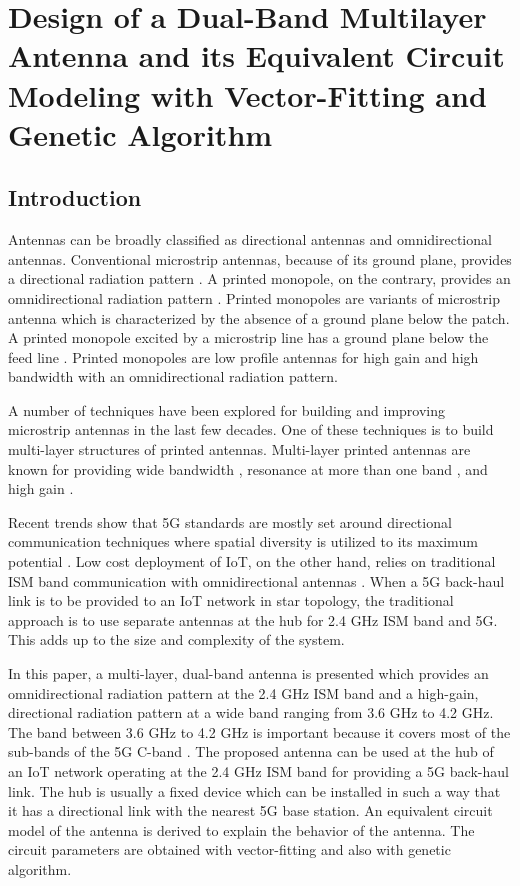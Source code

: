 \chapter{Design of a Dual-Band Multilayer Antenna and its Equivalent Circuit Modeling with Vector-Fitting and Genetic Algorithm}
\label{chap:chap4}
\section{Introduction}\label{c4sec:intro}
Antennas can be broadly classified as directional antennas and omnidirectional antennas. Conventional microstrip antennas, because of its ground plane, provides a directional radiation pattern \cite{handbook}. A printed monopole, on the contrary, provides an omnidirectional radiation pattern \cite{pma_stripline, pma_dualband}. Printed monopoles are variants of microstrip antenna which is characterized by the absence of a ground plane below the patch. A printed monopole excited by a microstrip line has a ground plane below the feed line \cite{pma_stripline}. Printed monopoles are low profile antennas for high gain and high bandwidth with an omnidirectional radiation pattern\cite{PMA01}.

A number of techniques have been explored for building and improving microstrip antennas in the last few decades. One of these techniques is to build multi-layer structures of printed antennas. Multi-layer printed antennas are known for providing wide bandwidth \cite{ML_WideBand01}, resonance at more than one band \cite{ML_DualBand01, ML_DualBand02}, and high gain \cite{ML_high_gain_parasitic_slot}.

Recent trends show that 5G standards are mostly set around directional communication techniques where spatial diversity is utilized to its maximum potential \cite{5G_surv1, 5G_surv2}. Low cost deployment of IoT, on the other hand, relies on traditional ISM band communication with omnidirectional antennas \cite{iot-ant1,iot-ant2,iot-ant3}. When a 5G back-haul link is to be provided to an IoT network in star topology, the traditional approach is to use separate antennas at the hub for 2.4 GHz ISM band and 5G. This adds up to the size and complexity of the system.

In this paper, a multi-layer, dual-band antenna is presented which provides an omnidirectional radiation pattern at the 2.4 GHz ISM band and a high-gain, directional radiation pattern at a wide band ranging from 3.6 GHz to 4.2 GHz. The band between 3.6 GHz to 4.2 GHz is important because it covers most of the sub-bands of the 5G C-band \cite{5G_tutorial, 5G_standards}. The proposed antenna can be used at the hub of an IoT network operating at the 2.4 GHz ISM band for providing a 5G back-haul link. The hub is usually a fixed device which can be installed in such a way that it has a directional link with the nearest 5G base station. An equivalent circuit model of the antenna is derived to explain the behavior of the antenna. The circuit parameters are obtained with vector-fitting and also with genetic algorithm.

